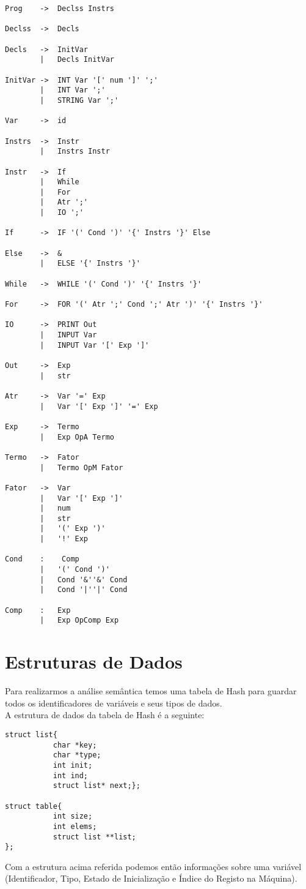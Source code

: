 \documentclass{report}
\begin{document}
\begin{verbatim}
Prog	->	Declss Instrs

Declss	->	Decls	

Decls	->	InitVar
		|	Decls InitVar

InitVar	->	INT Var '[' num ']' ';'
		|	INT Var ';'
		|	STRING Var ';'

Var		->	id

Instrs	->	Instr
		|	Instrs Instr

Instr	->	If
		|	While
		|	For
		|	Atr	';'
		|	IO ';'

If 		->	IF '(' Cond ')' '{' Instrs '}' Else

Else 	->	&
		|	ELSE '{' Instrs '}'

While 	-> 	WHILE '(' Cond ')' '{' Instrs '}'

For		->	FOR '(' Atr ';' Cond ';' Atr ')' '{' Instrs '}'

IO		->	PRINT Out
		|	INPUT Var
		|	INPUT Var '[' Exp ']'

Out		->	Exp
		|	str

Atr		->	Var '=' Exp
		|	Var '[' Exp ']' '=' Exp

Exp		->	Termo
		|	Exp OpA	Termo

Termo	->	Fator
		|	Termo OpM Fator

Fator	->	Var
		|	Var '[' Exp ']'
		|	num
		|	str
		|	'(' Exp ')'
		|	'!' Exp

Cond	:	 Comp
		|	'(' Cond ')'
		|	Cond '&''&' Cond
		|	Cond '|''|' Cond

Comp	:	Exp
		|	Exp OpComp Exp
\end{verbatim}

\section{Estruturas de Dados}
Para realizarmos a análise semântica temos uma tabela de Hash para guardar todos os identificadores de variáveis e seus tipos de dados. \\A estrutura de dados da tabela de Hash é a seguinte:\\
\begin{verbatim}
struct list{
           char *key;
           char *type;
           int init;
           int ind;
           struct list* next;};

struct table{
           int size;
           int elems;
           struct list **list;
};
\end{verbatim}
Com a estrutura acima referida podemos então informações sobre uma variável (Identificador, Tipo, Estado de Inicialização e Índice do Registo na Máquina).
\end{document}
